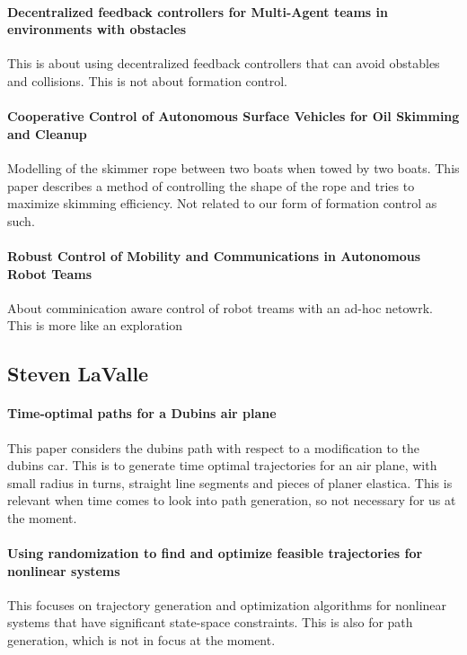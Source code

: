 \paragraph{Decentralized feedback controllers for Multi-Agent teams in environments with obstacles}
	This is about using decentralized feedback controllers that can
	avoid obstables and collisions. This is not about formation control.

\paragraph{Cooperative Control of Autonomous Surface Vehicles for Oil Skimming and Cleanup}
	Modelling of the skimmer rope between two boats when towed by two
	boats. This paper describes a method of controlling the shape of the
	rope and tries to maximize skimming efficiency. Not related to our
	form of formation control as such.

\paragraph{Robust Control of Mobility and Communications in Autonomous Robot Teams}
	About comminication aware control of robot treams with an ad-hoc
	netowrk. This is more like an exploration 


\subsection{Steven LaValle}

\paragraph{Time-optimal paths for a Dubins air plane}
This paper considers the dubins path with respect to a modification to the dubins car. This is to generate time optimal trajectories for an air plane, with small radius in turns, straight line segments and pieces of planer elastica.
This is relevant when time comes to look into path generation, so not necessary for us at the moment.

\paragraph{Using randomization to find and optimize feasible trajectories for nonlinear systems}
This focuses on trajectory generation and optimization algorithms for nonlinear systems that have significant state-space constraints.
This is also for path generation, which is not in focus at the moment.

